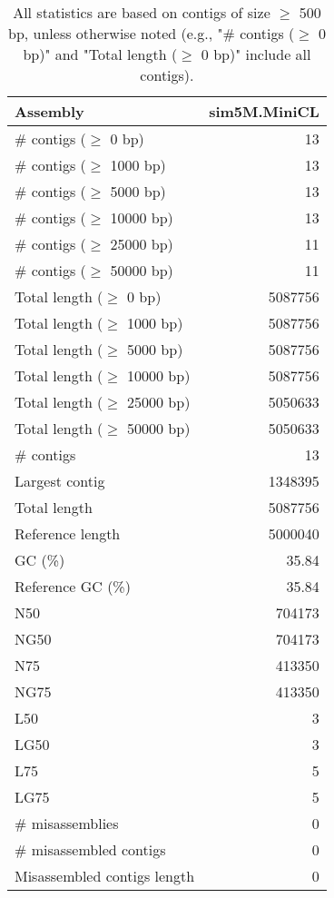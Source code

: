 \documentclass[12pt,a4paper]{article}
\begin{document}
\begin{table}[ht]
\begin{center}
\caption{All statistics are based on contigs of size $\geq$ 500 bp, unless otherwise noted (e.g., "\# contigs ($\geq$ 0 bp)" and "Total length ($\geq$ 0 bp)" include all contigs).}
\begin{tabular}{|l*{1}{|r}|}
\hline
Assembly & sim5M.MiniCL \\ \hline
\# contigs ($\geq$ 0 bp) & 13 \\ \hline
\# contigs ($\geq$ 1000 bp) & 13 \\ \hline
\# contigs ($\geq$ 5000 bp) & 13 \\ \hline
\# contigs ($\geq$ 10000 bp) & 13 \\ \hline
\# contigs ($\geq$ 25000 bp) & 11 \\ \hline
\# contigs ($\geq$ 50000 bp) & 11 \\ \hline
Total length ($\geq$ 0 bp) & 5087756 \\ \hline
Total length ($\geq$ 1000 bp) & 5087756 \\ \hline
Total length ($\geq$ 5000 bp) & 5087756 \\ \hline
Total length ($\geq$ 10000 bp) & 5087756 \\ \hline
Total length ($\geq$ 25000 bp) & 5050633 \\ \hline
Total length ($\geq$ 50000 bp) & 5050633 \\ \hline
\# contigs & 13 \\ \hline
Largest contig & 1348395 \\ \hline
Total length & 5087756 \\ \hline
Reference length & 5000040 \\ \hline
GC (\%) & 35.84 \\ \hline
Reference GC (\%) & 35.84 \\ \hline
N50 & 704173 \\ \hline
NG50 & 704173 \\ \hline
N75 & 413350 \\ \hline
NG75 & 413350 \\ \hline
L50 & 3 \\ \hline
LG50 & 3 \\ \hline
L75 & 5 \\ \hline
LG75 & 5 \\ \hline
\# misassemblies & 0 \\ \hline
\# misassembled contigs & 0 \\ \hline
Misassembled contigs length & 0 \\ \hline

\end{tabular}
\end{center}
\end{table}
\end{document}

